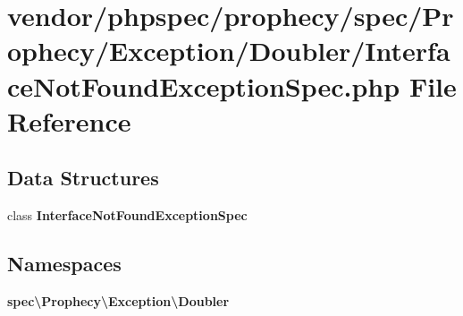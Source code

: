 \section{vendor/phpspec/prophecy/spec/\+Prophecy/\+Exception/\+Doubler/\+Interface\+Not\+Found\+Exception\+Spec.php File Reference}
\label{_interface_not_found_exception_spec_8php}
\subsection*{Data Structures}
\begin{DoxyCompactItemize}
\item 
class {\bf Interface\+Not\+Found\+Exception\+Spec}
\end{DoxyCompactItemize}
\subsection*{Namespaces}
\begin{DoxyCompactItemize}
\item 
 {\bf spec\textbackslash{}\+Prophecy\textbackslash{}\+Exception\textbackslash{}\+Doubler}
\end{DoxyCompactItemize}
